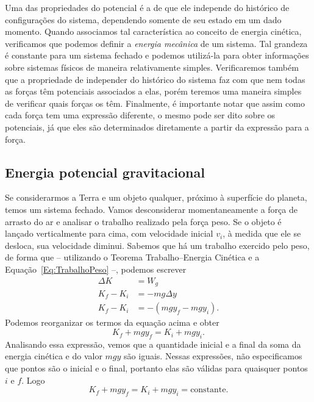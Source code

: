 Uma das propriedades do potencial é a de que ele independe do histórico de configurações do sistema, dependendo somente de seu estado em um dado momento. Quando associamos tal característica ao conceito de energia cinética, verificamos que podemos definir a \emph{energia mecânica} de um sistema. Tal grandeza é constante para um sistema fechado e podemos utilizá-la para obter informações sobre sistemas físicos de maneira relativamente simples. Verificaremos também que a propriedade de independer do histórico do sistema faz com que nem todas as forças têm potenciais associados a elas, porém teremos uma maneira simples de verificar quais forças os têm. Finalmente, é importante notar que assim como cada força tem uma expressão diferente, o mesmo pode ser dito sobre os potenciais, já que eles são determinados diretamente a partir da expressão para a força.


\subsection{Energia potencial gravitacional}

Se considerarmos a Terra e um objeto qualquer, próximo à superfície do planeta, temos um sistema fechado. Vamos desconsiderar momentaneamente a força de arrasto do ar e analisar o trabalho realizado pela força peso. Se o objeto é lançado verticalmente para cima, com velocidade inicial $v_i$, à medida que ele se desloca, sua velocidade diminui. Sabemos que há um trabalho exercido pelo peso, de forma que -- utilizando o Teorema Trabalho--Energia Cinética e a Equação~\ref{Eq:TrabalhoPeso} --, podemos escrever
\begin{align}
  \Delta K &= W_g \\
  K_f - K_i &=  -mg\Delta y \\
  K_f - K_i &=  -(mgy_f - mgy_i).
\end{align}
%
Podemos reorganizar os termos da equação acima e obter
\begin{equation}
  K_f + mgy_f = K_i + mgy_i.
\end{equation}
%
Analisando essa expressão, vemos que a quantidade inicial e a final da soma da energia cinética e do valor $mgy$ são iguais. Nessas expressões, não especificamos que pontos são o inicial e o final, portanto elas são válidas para quaisquer pontos $i$ e $f$. Logo
\begin{equation}
  K_f + mgy_f = K_i + mgy_i = \textrm{constante}.
\end{equation}

